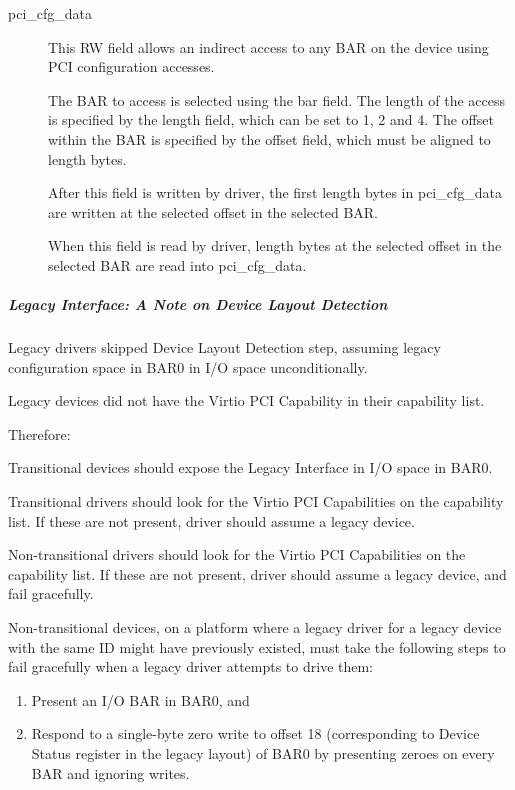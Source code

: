 \begin{description}
\item[pci_cfg_data]

        This RW field allows an indirect access to any BAR on the
        device using PCI configuration accesses.

        The BAR to access is selected using the bar field.
        The length of the access is specified by the length
        field, which can be set to 1, 2 and 4.
        The offset within the BAR is specified by the offset
        field, which must be aligned to length bytes.

        After this field is written by driver, the first length
        bytes in pci_cfg_data are written at the selected
        offset in the selected BAR.

        When this field is read by driver, length bytes at the
        selected offset in the selected BAR are read into pci_cfg_data.
\end{description}

\subparagraph{Legacy Interface: A Note on Device Layout Detection}\label{sec:Virtio Transport Options / Virtio Over PCI Bus / PCI-specific Initialization And Device Operation / Device Initialization / Virtio Device Configuration Layout Detection / Legacy Interface: A Note on Device Layout Detection}

Legacy drivers skipped  Device Layout Detection step, assuming legacy
configuration space in BAR0 in I/O space unconditionally.

Legacy devices did not have the Virtio PCI Capability in their
capability list.

Therefore:

Transitional devices should expose the Legacy Interface in I/O
space in BAR0.

Transitional drivers should look for the Virtio PCI
Capabilities on the capability list.
If these are not present, driver should assume a legacy device.

Non-transitional drivers should look for the Virtio PCI
Capabilities on the capability list.
If these are not present, driver should assume a legacy device,
and fail gracefully.

Non-transitional devices, on a platform where a legacy driver for
a legacy device with the same ID might have previously existed,
must take the following steps to fail gracefully when a legacy
driver attempts to drive them:

\begin{enumerate}
\item Present an I/O BAR in BAR0, and
\item Respond to a single-byte zero write to offset 18
   (corresponding to Device Status register in the legacy layout)
   of BAR0 by presenting zeroes on every BAR and ignoring writes.
\end{enumerate}

